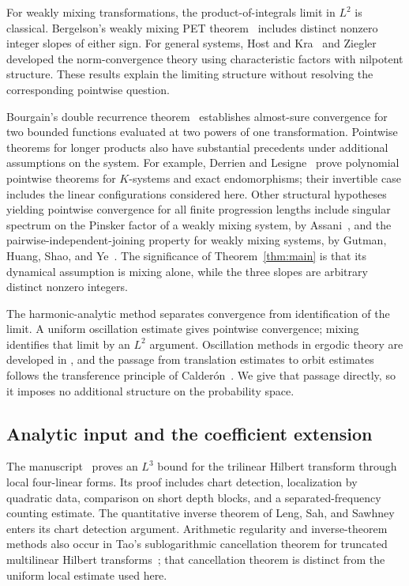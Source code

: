 For weakly mixing transformations, the product-of-integrals limit in
$L^2$ is classical. Bergelson's
weakly mixing PET theorem~\cite[Theorem~1.2 and p.~340]{Bergelson}
includes distinct nonzero integer slopes of either sign.
For general systems, Host and Kra~\cite{HostKra} and
Ziegler~\cite{Ziegler} developed the norm-convergence theory using
characteristic factors with nilpotent structure. These results explain
the limiting structure without resolving the corresponding pointwise
question.

Bourgain's double recurrence theorem~\cite{Bourgain} establishes
almost-sure convergence for two bounded functions evaluated at two
powers of one transformation. Pointwise theorems for longer products
also have substantial precedents under additional assumptions on the
system. For example, Derrien and Lesigne~\cite[Theorem~4.2]{DerrienLesigne}
prove polynomial pointwise theorems for $K$-systems and exact
endomorphisms; their invertible case includes the linear configurations
considered here. Other structural hypotheses yielding pointwise
convergence for all finite progression lengths include singular spectrum
on the Pinsker factor of a weakly mixing system, by
Assani~\cite{Assani}, and the pairwise-independent-joining property for
weakly mixing systems, by Gutman, Huang, Shao, and Ye~\cite{GHSY}.
The significance of Theorem~\ref{thm:main} is that its
dynamical assumption is mixing alone, while the three slopes are
arbitrary distinct nonzero integers.

The harmonic-analytic method separates convergence from identification
of the limit. A uniform oscillation estimate gives pointwise
convergence; mixing identifies that limit by an $L^2$ argument.
Oscillation methods in ergodic theory are developed in
\cite{Bourgain,JKRW}, and the passage from translation estimates to
orbit estimates follows the transference principle of
Calder\'on~\cite{Calderon}. We give that passage directly, so it imposes
no additional structure on the probability space.

\subsection{Analytic input and the coefficient extension}
The manuscript~\cite{H} proves an $L^3$ bound for the trilinear Hilbert
transform through local four-linear forms. Its proof includes chart
detection, localization by quadratic data, comparison on short depth
blocks, and a separated-frequency counting estimate. The quantitative
inverse theorem of Leng, Sah, and Sawhney~\cite{LSS} enters its chart
detection argument. Arithmetic regularity and inverse-theorem methods
also occur in Tao's sublogarithmic cancellation theorem for truncated
multilinear Hilbert transforms~\cite{Tao}; that cancellation theorem is
distinct from the uniform local estimate used here.

